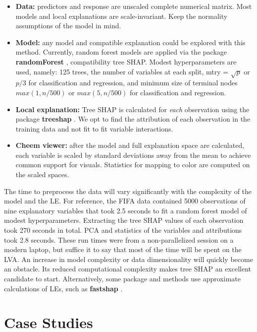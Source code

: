 \documentclass[
]{sn-jnl}
\providecommand{\tightlist}{%
  \setlength{\itemsep}{0pt}\setlength{\parskip}{0pt}}
\begin{document}
\begin{itemize}
\tightlist
\item
  \textbf{Data:} predictors and response are unscaled complete numerical
  matrix. Most models and local explanations are scale-invariant. Keep
  the normality assumptions of the model in mind.
\item
  \textbf{Model:} any model and compatible explanation could be explored
  with this method. Currently, random forest models are applied via the
  package \textbf{randomForest} \citep{liaw_classification_2002},
  compatibility tree SHAP. Modest hyperparameters are used, namely: 125
  trees, the number of variables at each split, mtry = \(\sqrt{p}\) or
  \(p/3\) for classification and regression, and minimum size of
  terminal nodes \(max(1, n/500)\) or \(max(5, n/500)\) for
  classification and regression.
\item
  \textbf{Local explanation:} Tree SHAP is calculated for \emph{each}
  observation using the package \textbf{treeshap}
  \citep{kominsarczyk_treeshap_2021}. We opt to find the attribution of
  each observation in the training data and not fit to fit variable
  interactions.
\item
  \textbf{Cheem viewer:} after the model and full explanation space are
  calculated, each variable is scaled by standard deviations away from
  the mean to achieve common support for visuals. Statistics for mapping
  to color are computed on the scaled spaces.
\end{itemize}

The time to preprocess the data will vary significantly with the
complexity of the model and the LE. For reference, the FIFA data
contained 5000 observations of nine explanatory variables that took 2.5
seconds to fit a random forest model of modest hyperparameters.
Extracting the tree SHAP values of each observation took 270 seconds in
total. PCA and statistics of the variables and attributions took 2.8
seconds. These run times were from a non-parallelized session on a
modern laptop, but suffice it to say that most of the time will be spent
on the LVA. An increase in model complexity or data dimensionality will
quickly become an obstacle. Its reduced computational complexity makes
tree SHAP an excellent candidate to start. Alternatively, some package
and methods use approximate calculations of LEs, such as
\textbf{fastshap} \citet{greenwell_fastshap_2020}.

\hypertarget{sec:casestudies}{%
\section{Case Studies}\label{sec:casestudies}}
\end{document}
